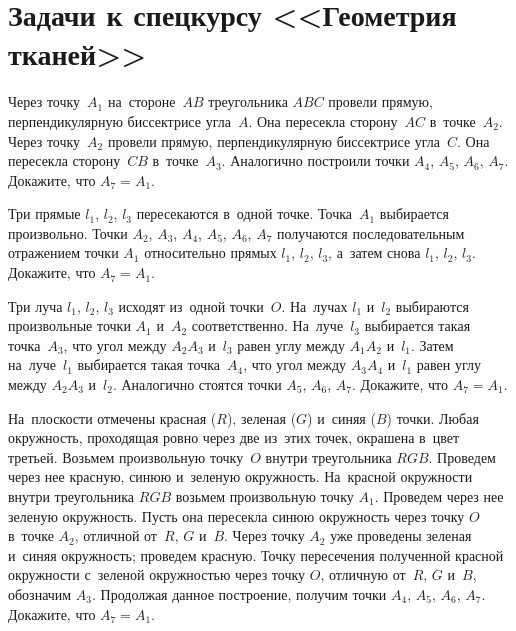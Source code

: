 
\section*{Задачи к спецкурсу <<Геометрия тканей>>}


\begin{problems}
\def\R{\ensuremath{R}}
\def\G{\ensuremath{G}}
\def\B{\ensuremath{B}}

\item
Через точку~$A_1$ на~стороне~$AB$ треугольника $ABC$ провели прямую,
перпендикулярную биссектрисе угла~$A$.
Она пересекла сторону~$AC$ в~точке~$A_2$.
Через точку~$A_2$ провели прямую, перпендикулярную биссектрисе угла~$C$.
Она пересекла сторону~$CB$ в~точке~$A_3$.
Аналогично построили точки $A_4$, $A_5$, $A_6$, $A_7$.
Докажите, что $A_7 = A_1$.

\item
Три прямые $l_1$, $l_2$, $l_3$ пересекаются в~одной точке.
Точка~$A_1$ выбирается произвольно.
Точки $A_2$, $A_3$, $A_4$, $A_5$, $A_6$, $A_7$
получаются последовательным отражением точки $A_1$ относительно
прямых $l_1$, $l_2$, $l_3$, а~затем снова $l_1$, $l_2$, $l_3$.
Докажите, что $A_7 = A_1$.

\item
Три луча $l_1$, $l_2$, $l_3$ исходят из~одной точки~$O$.
На~лучах $l_1$ и~$l_2$ выбираются произвольные точки $A_1$ и~$A_2$
соответственно.
На~луче~$l_3$ выбирается такая точка~$A_3$, что угол между $A_2 A_3$ и~$l_3$
равен углу между $A_1 A_2$ и~$l_1$.
Затем на~луче~$l_1$ выбирается такая точка~$A_4$, что угол между $A_3 A_4$
и~$l_1$ равен углу между $A_2 A_3$ и~$l_2$.
Аналогично стоятся точки $A_5$, $A_6$, $A_7$.
Докажите, что $A_7 = A_1$.

\item
На~плоскости отмечены красная ({\R}), зеленая ({\G}) и~синяя ({\B}) точки.
Любая окружность, проходящая ровно через две из~этих точек, окрашена в~цвет
третьей.
Возьмем произвольную точку~$O$ внутри треугольника $RGB$.
Проведем через нее красную, синюю и~зеленую окружность.
На~красной окружности внутри треугольника $RGB$ возьмем произвольную точку
$A_1$.
Проведем через нее зеленую окружность.
Пусть она пересекла синюю окружность через точку $O$ в~точке $A_2$,
отличной от~{\R}, {\G} и~{\B}.
Через точку $A_2$ уже проведены зеленая и~синяя окружность;
проведем красную.
Точку пересечения полученной красной окружности с~зеленой окружностью через
точку $O$, отличную от~{\R}, {\G} и~{\B}, обозначим $A_3$.
Продолжая данное построение, получим точки $A_4$, $A_5$, $A_6$, $A_7$.
Докажите, что $A_7 = A_1$.


\end{problems}
